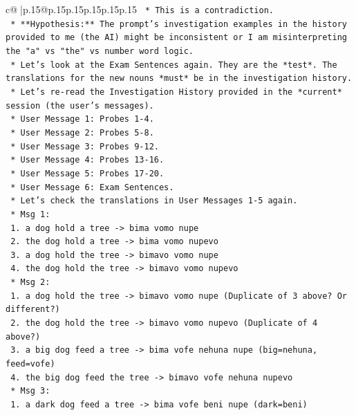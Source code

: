 \documentclass{article}
\begin{document}
{\begin{supertabular}{c@{$\;$}|p{.15\linewidth}@{}p{.15\linewidth}p{.15\linewidth}p{.15\linewidth}p{.15\linewidth}p{.15\linewidth}}
{{{\texttt{                    *   This is a contradiction.} \\
\texttt{    *   **Hypothesis:** The prompt's investigation examples in the history provided to me (the AI) might be inconsistent or I am misinterpreting the "a" vs "the" vs number word logic.} \\
\texttt{    *   Let's look at the Exam Sentences again. They are the *test*. The translations for the new nouns *must* be in the investigation history.} \\
\texttt{    *   Let's re{-}read the Investigation History provided in the *current* session (the user's messages).} \\
\texttt{        *   User Message 1: Probes 1{-}4.} \\
\texttt{        *   User Message 2: Probes 5{-}8.} \\
\texttt{        *   User Message 3: Probes 9{-}12.} \\
\texttt{        *   User Message 4: Probes 13{-}16.} \\
\texttt{        *   User Message 5: Probes 17{-}20.} \\
\texttt{        *   User Message 6: Exam Sentences.} \\
\texttt{    *   Let's check the translations in User Messages 1{-}5 again.} \\
\texttt{        *   Msg 1:} \\
\texttt{            1. a dog hold a tree {-}> bima vomo nupe} \\
\texttt{            2. the dog hold a tree {-}> bima vomo nupevo} \\
\texttt{            3. a dog hold the tree {-}> bimavo vomo nupe} \\
\texttt{            4. the dog hold the tree {-}> bimavo vomo nupevo} \\
\texttt{        *   Msg 2:} \\
\texttt{            1. a dog hold the tree {-}> bimavo vomo nupe (Duplicate of 3 above? Or different?)} \\
\texttt{            2. the dog hold the tree {-}> bimavo vomo nupevo (Duplicate of 4 above?)} \\
\texttt{            3. a big dog feed a tree {-}> bima vofe nehuna nupe (big=nehuna, feed=vofe)} \\
\texttt{            4. the big dog feed the tree {-}> bimavo vofe nehuna nupevo} \\
\texttt{        *   Msg 3:} \\
\texttt{            1. a dark dog feed a tree {-}> bima vofe beni nupe (dark=beni)} \\
}}}
\end{supertabular}}
\end{document}
